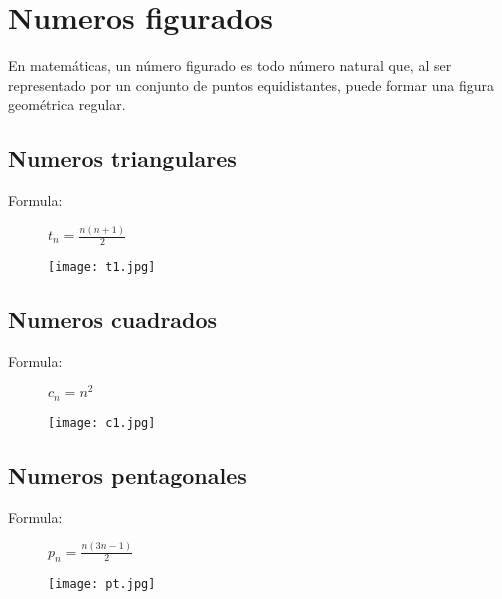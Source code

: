 \documentclass{article}
\begin{document}
\section{Numeros figurados}
En matemáticas, un número figurado es todo número natural que, al ser representado por un conjunto de puntos equidistantes, puede formar una figura geométrica regular.\cite{rosas2008numeros}

\subsection{Numeros triangulares}
\begin{description}
\item[Formula:] $t_n= \frac{n\left ( n+1 \right )}{2}$
\end{description}
\begin{figure}[H]
\centering
\texttt{[image: t1.jpg]}
\end{figure}
\subsection{Numeros cuadrados}
\begin{description}
\item[Formula:] $c_n= n^{2}$
\end{description}
\begin{figure}[H]
\centering
\texttt{[image: c1.jpg]}
\end{figure}
\subsection{Numeros pentagonales}
\begin{description}
\item[Formula:] $p_n=\frac{n\left ( 3n-1 \right )}{2}$
\end{description}
\begin{figure}[H]
\centering
\texttt{[image: pt.jpg]}
\end{figure}


\end{document}
